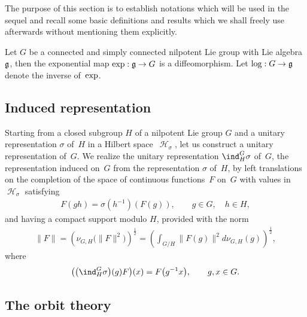 \documentclass[pdftex]{sigma}
\DeclareMathOperator{\Hi}{\mathscr{H}}
\begin{document}
The purpose of this section is to establish notations which will be
used in the sequel and recall some basic def\/initions and results
which we shall freely use afterwards without mentioning them
explicitly.

 Let $G$  be a connected and simply
connected nilpotent Lie group with Lie algebra $\frak g$, then the
exponential map ${\rm exp}: \frak g \rightarrow G$ is a
dif\/feomorphism. Let $\log: G \rightarrow \frak g$
denote the inverse of~${\rm exp}$.

\subsection{Induced representation}\label{section2.1} %

Starting from a closed
subgroup $H$ of a nilpotent Lie group $G$ and a unitary
representation $\sigma$ of~$H$ in a Hilbert space~$\Hi_\sigma$, let
us construct a unitary representation of~$G$. We realize the unitary
representation $\ind_H^G\sigma$ of~$G$, the representation induced
on~$G$ from the representation $\sigma$ of~$H$, by left translations
on the completion of the space of continuous functions~$F$ on~$G$
with values in~$\Hi_\sigma$ satisfying
\begin{gather}\label{covarience}
F(gh) = \sigma(h^{-1})(F(g)),\qquad  g\in G, \quad h\in H,
\end{gather}
and having a compact support modulo $H$, provided with the norm
\begin{gather*}%
\|F\| = \left(\nu_{G, H}\big(\|F\|^2\big)\right)^{\frac{1}{2}} =
\left(\int_{G/H} \|F(g)\|^2 d\nu_{G, H}(g)\right)^{\frac{1}{2}},
\end{gather*}
where
\begin{gather*}
\big(\big(\ind_H^G\sigma\big)(g) F\big)(x) = F\big(g^{-1} x\big),\qquad g, x\in G.
\end{gather*}

\subsection{The orbit theory}\label{section2.2}
\end{document}
